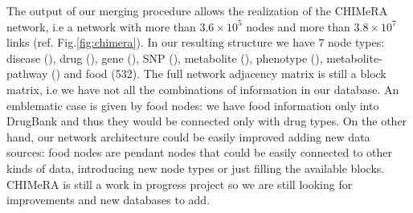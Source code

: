 \documentclass{standalone}
\begin{document}
The output of our merging procedure allows the realization of the \textsf{CHIMeRA} network, i.e a network with more than $3.6\times10^5$ nodes and more than $3.8\times10^7$ links (ref. Fig.\ref{fig:chimera}).
In our resulting structure we have $7$ node types: disease (), drug (), gene (), SNP (), metabolite (), phenotype (), metabolite-pathway () and food (532).
The full network adjacency matrix is still a block matrix, i.e we have not all the combinations of information in our database.
An emblematic case is given by food nodes: we have food information only into DrugBank and thus they would be connected only with drug types.
On the other hand, our network architecture could be easily improved adding new data sources: food nodes are pendant nodes that could be easily connected to other kinds of data, introducing new node types or just filling the available blocks.
\textsf{CHIMeRA} is still a work in progress project so we are still looking for improvements and new databases to add.


\end{document}
